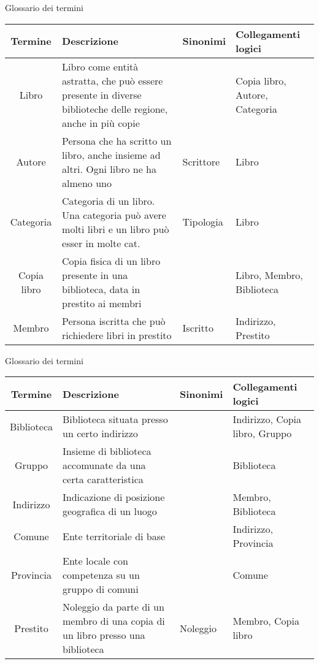 \begin{frame}{Glossario dei termini}
    \scriptsize
    \def\arraystretch{1.4}
    \begin{center}
        \begin{tabular}{|c|m{5.5cm}|m{1.2cm}|m{1.5cm}|}
            \hline
            \textbf{Termine}    & \textbf{Descrizione} & \textbf{Sinonimi} & \textbf{Collegamenti logici} \\ \hline
            Libro               & Libro come entità astratta, che può essere presente in diverse biblioteche delle regione, anche in più copie &  & Copia libro, Autore, Categoria \\ \hline
            Autore              & Persona che ha scritto un libro, anche insieme ad altri. Ogni libro ne ha almeno uno & Scrittore & Libro \\ \hline
            Categoria           & Categoria di un libro. Una categoria può avere molti libri e un libro può esser in molte cat. & Tipologia   & Libro \\ \hline
            Copia libro         & Copia fisica di un libro presente in una biblioteca, data in prestito ai membri &  & Libro, Membro, Biblioteca  \\ \hline
            Membro              & Persona iscritta che può richiedere libri in prestito & Iscritto & Indirizzo, Prestito \\ \hline
        \end{tabular}
    \end{center}
\end{frame}

\begin{frame}{Glossario dei termini}
    \scriptsize
    \def\arraystretch{1.5}
    \begin{center}
        \begin{tabular}{|c|m{5.5cm}|m{1.2cm}|m{1.5cm}|}
            \hline
            \textbf{Termine}    & \textbf{Descrizione} & \textbf{Sinonimi} & \textbf{Collegamenti logici} \\ \hline
            Biblioteca          & Biblioteca situata presso un certo indirizzo &  & Indirizzo, Copia libro, Gruppo\\ \hline
            Gruppo              & Insieme di biblioteca accomunate da una certa caratteristica &  & Biblioteca \\ \hline
            Indirizzo           & Indicazione di posizione geografica di un luogo &  & Membro, Biblioteca \\ \hline
            Comune              & Ente territoriale di base & & Indirizzo, Provincia \\ \hline
            Provincia           & Ente locale con competenza su un gruppo di comuni & & Comune \\ \hline
            Prestito            & Noleggio da parte di un membro di una copia di un libro presso una biblioteca & Noleggio & Membro, Copia libro \\ \hline
        \end{tabular}
    \end{center}
\end{frame}

